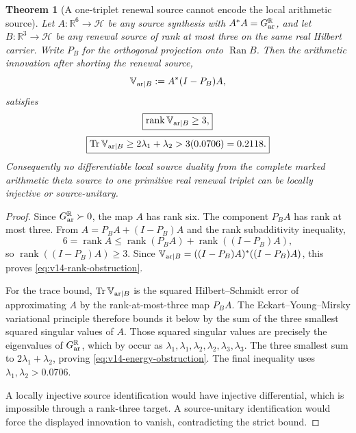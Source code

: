 \documentclass[11pt]{article}
\newtheorem{theorem}{Theorem}[section]
\theoremstyle{definition}
\theoremstyle{remark}
\newcommand{\R}{\mathbb R}
\newcommand{\Tr}{\operatorname{Tr}}
\newcommand{\rank}{\operatorname{rank}}
\begin{document}
\begin{theorem}[A one-triplet renewal source cannot encode the local arithmetic source]
\label{thm:v14-one-triplet-no-go}
Let $A:\R^6\to\mathcal H$ be any source synthesis with
$A^*A=G_{\rm ar}^{\R}$, and let $B:\R^3\to\mathcal H$ be any renewal source
of rank at most three on the same real Hilbert carrier.  Write $P_B$ for the
orthogonal projection onto $\operatorname{Ran} B$.  Then the arithmetic innovation after
shorting the renewal source,
\[
 \mathbb V_{{\rm ar}\mid B}
 :=A^*(I-P_B)A,
\]
satisfies
\begin{equation}
 \boxed{
 \rank\mathbb V_{{\rm ar}\mid B}\ge3,}
 \label{eq:v14-rank-obstruction}
\end{equation}
\begin{equation}
 \boxed{
 \Tr\mathbb V_{{\rm ar}\mid B}
 \ge 2\lambda_1+\lambda_2
 >3(0.0706)=0.2118.}
 \label{eq:v14-energy-obstruction}
\end{equation}
Consequently no differentiable local source duality from the complete marked
arithmetic theta source to one primitive real renewal triplet can be locally
injective or source-unitary.
\end{theorem}

\begin{proof}
Since $G_{\rm ar}^{\R}\succ0$, the map $A$ has rank six.  The component
$P_BA$ has rank at most three.  From
$A=P_BA+(I-P_B)A$ and the rank subadditivity inequality,
\[
 6=\rank A\le\rank(P_BA)+\rank((I-P_B)A),
\]
so $\rank((I-P_B)A)\ge3$.  Since
$\mathbb V_{{\rm ar}\mid B}=((I-P_B)A)^*((I-P_B)A)$, this proves
\eqref{eq:v14-rank-obstruction}.

For the trace bound, $\Tr\mathbb V_{{\rm ar}\mid B}$ is the squared
Hilbert--Schmidt error of approximating $A$ by the rank-at-most-three map
$P_BA$.  The Eckart--Young--Mirsky variational principle therefore bounds it
below by the sum of the three smallest squared singular values of $A$.  Those
squared singular values are precisely the eigenvalues of
$G_{\rm ar}^{\R}$, which by
 occur as
$\lambda_1,\lambda_1,\lambda_2,\lambda_2,\lambda_3,\lambda_3$.  The three
smallest sum to $2\lambda_1+\lambda_2$, proving
\eqref{eq:v14-energy-obstruction}.  The final inequality uses
$\lambda_1,\lambda_2>0.0706$.

A locally injective source identification would have injective differential,
which is impossible through a rank-three target.  A source-unitary
identification would force the displayed innovation to vanish, contradicting
the strict bound.
\end{proof}
\end{document}
